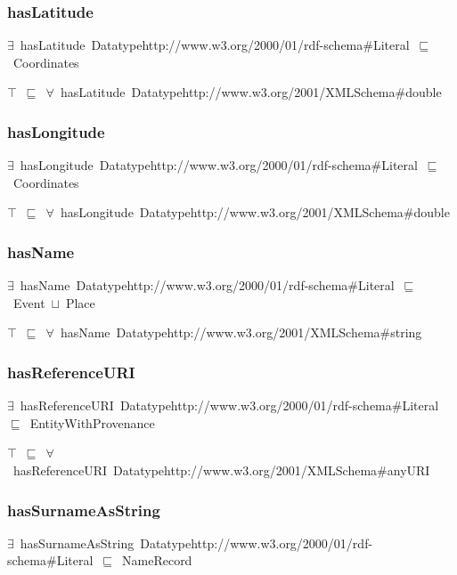 \documentclass{article}
\begin{document}
\subsubsection*{hasLatitude}

\ensuremath{\exists}~hasLatitude~Datatypehttp://www.w3.org/2000/01/rdf-schema#Literal~\ensuremath{\sqsubseteq}~Coordinates

\ensuremath{\top}~\ensuremath{\sqsubseteq}~\ensuremath{\forall}~hasLatitude~Datatypehttp://www.w3.org/2001/XMLSchema#double

\subsubsection*{hasLongitude}

\ensuremath{\exists}~hasLongitude~Datatypehttp://www.w3.org/2000/01/rdf-schema#Literal~\ensuremath{\sqsubseteq}~Coordinates

\ensuremath{\top}~\ensuremath{\sqsubseteq}~\ensuremath{\forall}~hasLongitude~Datatypehttp://www.w3.org/2001/XMLSchema#double

\subsubsection*{hasName}

\ensuremath{\exists}~hasName~Datatypehttp://www.w3.org/2000/01/rdf-schema#Literal~\ensuremath{\sqsubseteq}~Event~\ensuremath{\sqcup}~Place

\ensuremath{\top}~\ensuremath{\sqsubseteq}~\ensuremath{\forall}~hasName~Datatypehttp://www.w3.org/2001/XMLSchema#string

\subsubsection*{hasReferenceURI}

\ensuremath{\exists}~hasReferenceURI~Datatypehttp://www.w3.org/2000/01/rdf-schema#Literal~\ensuremath{\sqsubseteq}~EntityWithProvenance

\ensuremath{\top}~\ensuremath{\sqsubseteq}~\ensuremath{\forall}~hasReferenceURI~Datatypehttp://www.w3.org/2001/XMLSchema#anyURI

\subsubsection*{hasSurnameAsString}

\ensuremath{\exists}~hasSurnameAsString~Datatypehttp://www.w3.org/2000/01/rdf-schema#Literal~\ensuremath{\sqsubseteq}~NameRecord
\end{document}
